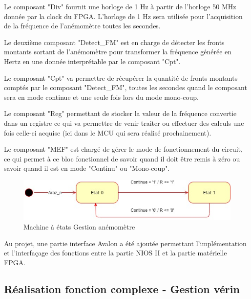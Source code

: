  Le composant "Div" fournit une horloge de 1 Hz à partir de l'horloge 50 MHz donnée par la clock du FPGA. L'horloge de 1 Hz sera utilisée pour l'acquisition de la fréquence de l'anémomètre toutes les secondes.

\newpage

  Le deuxième composant "Detect\_FM" est en charge de détecter les fronts montants sortant de l'anémomètre pour transformer la fréquence générée en Hertz en une donnée interprétable par le composant "Cpt".\\\newline

  Le composant "Cpt" va permettre de récupérer la quantité de fronts montants comptés par le composant "Detect\_FM", toutes les secondes quand le composant sera en mode continue et une seule fois lors du mode mono-coup.\\\newline

  Le composant "Reg" permettant de stocker la valeur de la fréquence convertie dans un registre ce qui va permettre de venir traiter ou effectuer des calculs une fois celle-ci acquise (ici dans le MCU qui sera réalisé prochainement).\\\newline

  Le composant "MEF" est chargé de gérer le mode de fonctionnement du circuit, ce qui permet à ce bloc fonctionnel de savoir quand il doit être remis à zéro ou savoir quand il est en mode "Continu" ou "Mono-coup".\vspace{1cm}
  \begin{figure}[h]
    \begin{center}
      \includegraphics[width=\textwidth]{images/MEF_anemo.jpg}
      \caption{Machine à états Gestion anémomètre}
    \end{center}
  \end{figure}

Au projet, une partie interface Avalon a été ajoutée permettant l'implémentation et l'interfaçage des fonctions entre la partie NIOS II et la partie matérielle FPGA. 
  \newpage

  \subsection{Réalisation fonction complexe - Gestion vérin}

